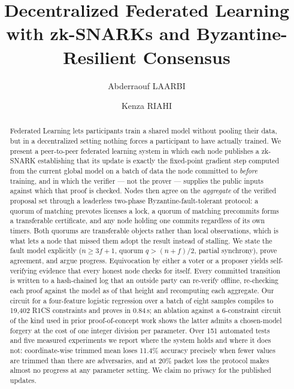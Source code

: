 \documentclass{llncs}
\begin{document}
\title{Decentralized Federated Learning\\with zk-SNARKs and Byzantine-Resilient Consensus}

\author{Abderraouf LAARBI \and Kenza RIAHI}

\maketitle

\begin{abstract}
Federated Learning lets participants train a shared model without pooling their
data, but in a decentralized setting nothing forces a participant to have
actually trained. We present a peer-to-peer federated learning system in which
each node publishes a zk-SNARK establishing that its update is exactly the
fixed-point gradient step computed from the current global model on a batch of
data the node committed to \emph{before} training, and in which the verifier ---
not the prover --- supplies the public inputs against which that proof is checked.
Nodes then agree on the \emph{aggregate} of the verified proposal set through a
leaderless two-phase Byzantine-fault-tolerant protocol: a quorum of matching
prevotes licenses a lock, a quorum of matching precommits forms a transferable
certificate, and any node holding one commits regardless of its own timers. Both
quorums are transferable objects rather than local observations, which is what
lets a node that missed them adopt the result instead of stalling. We
state the fault model explicitly ($n \geq 3f+1$, quorum $q > (n+f)/2$, partial
synchrony), prove agreement, and argue progress. Equivocation by either a voter
or a proposer yields self-verifying evidence that every honest node checks for
itself. Every committed transition is written to a hash-chained log that an
outside party can re-verify offline, re-checking each proof against the model as
of that height and recomputing each aggregate. Our circuit for a four-feature
logistic regression over a batch of eight samples compiles to 19{,}402 R1CS
constraints and proves in 0.84\,s; an ablation against a
6-constraint circuit of the kind used in prior proof-of-concept work shows the
latter admits a chosen-model forgery at the cost of one integer division per
parameter. Over 151 automated tests and five measured experiments we report
where the system holds and where it does not: coordinate-wise trimmed mean
loses 11.4\% accuracy precisely when fewer values are trimmed than
there are adversaries, and at 20\% packet loss the protocol makes
almost no progress at any parameter setting. We claim no privacy for the
published updates.
\end{abstract}
\end{document}
